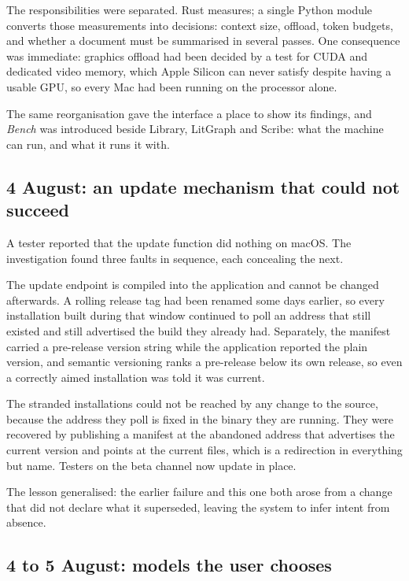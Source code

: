 \documentclass[11pt,a4paper]{article}
\begin{document}
The responsibilities were separated. Rust measures; a single Python module
converts those measurements into decisions: context size, offload, token
budgets, and whether a document must be summarised in several passes. One
consequence was immediate: graphics offload had been decided by a test for CUDA
and dedicated video memory, which Apple Silicon can never satisfy despite
having a usable GPU, so every Mac had been running on the processor alone.

The same reorganisation gave the interface a place to show its findings, and
\emph{Bench} was introduced beside Library, LitGraph and Scribe: what the
machine can run, and what it runs it with.

\subsection{4 August: an update mechanism that could not succeed}

A tester reported that the update function did nothing on macOS. The
investigation found three faults in sequence, each concealing the next.

The update endpoint is compiled into the application and cannot be changed
afterwards. A rolling release tag had been renamed some days earlier, so every
installation built during that window continued to poll an address that still
existed and still advertised the build they already had. Separately, the
manifest carried a pre-release version string while the application reported
the plain version, and semantic versioning ranks a pre-release below its own
release, so even a correctly aimed installation was told it was current.

The stranded installations could not be reached by any change to the source,
because the address they poll is fixed in the binary they are running. They
were recovered by publishing a manifest at the abandoned address that advertises
the current version and points at the current files, which is a redirection in
everything but name. Testers on the beta channel now update in place.

The lesson generalised: the earlier failure and this one both arose from a
change that did not declare what it superseded, leaving the system to infer
intent from absence.

\subsection{4 to 5 August: models the user chooses}
\end{document}
